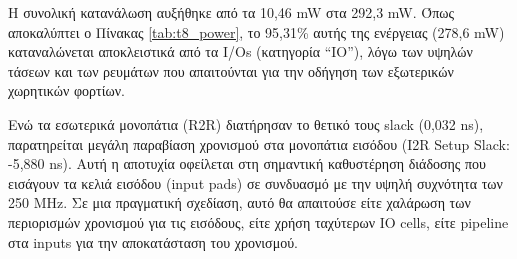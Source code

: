 Η συνολική κατανάλωση αυξήθηκε από τα 10,46 mW στα 292,3 mW.
Όπως αποκαλύπτει ο Πίνακας \ref{tab:t8_power}, το 95,31\% αυτής της ενέργειας (278,6 mW) καταναλώνεται αποκλειστικά από τα I/Os (κατηγορία “IO”), λόγω των υψηλών τάσεων και των ρευμάτων που απαιτούνται για την οδήγηση των εξωτερικών χωρητικών φορτίων.
\begin{table}[H]
    \centering
    \caption{Power Consumption per Category post Routing}
    \label{tab:t8_power}
\end{table}

Ενώ τα εσωτερικά μονοπάτια (R2R) διατήρησαν το θετικό τους slack (0,032 ns), παρατηρείται μεγάλη παραβίαση χρονισμού στα μονοπάτια εισόδου (I2R Setup Slack: -5,880 ns).
Αυτή η αποτυχία οφείλεται στη σημαντική καθυστέρηση διάδοσης που εισάγουν τα κελιά εισόδου (input pads) σε συνδυασμό με την υψηλή συχνότητα των 250 MHz.
Σε μια πραγματική σχεδίαση, αυτό θα απαιτούσε είτε χαλάρωση των περιορισμών χρονισμού για τις εισόδους, είτε χρήση ταχύτερων IO cells, είτε pipeline στα inputs για την αποκατάσταση του χρονισμού.